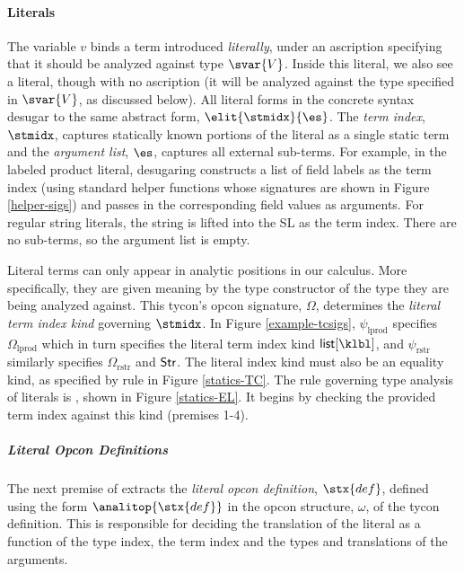 \paragraph{Literals} The variable $v$ binds a term introduced \emph{literally}, under an ascription specifying that it should be analyzed against type $\svar{V}$. Inside this literal, we also see a literal, though with no ascription (it will be analyzed against the type specified in $\svar{V}$, as discussed below). All literal forms in the concrete syntax desugar to the same abstract form, $\elit{\stmidx}{\es}$. The \emph{term index},  $\stmidx$, captures statically known portions of the literal as a single static term and the \emph{argument list}, $\es$,  captures all external sub-terms. For example, in the labeled product literal, desugaring constructs a list of field labels as the term index (using standard helper functions whose signatures are shown in Figure \ref{helper-sigs}) and passes in the  corresponding field values as arguments. For regular string literals, the string is lifted into the SL as the term index. There are no sub-terms, so the argument list is empty.

Literal terms can only appear in analytic positions in our calculus. More specifically, they are given meaning by {the type constructor of the type they are being analyzed against}. 
This tycon's opcon signature, $\Omega$,  determines the \emph{literal term index kind} governing $\stmidx$. In Figure \ref{example-tcsigs}, $\psi_\text{lprod}$ specifies $\Omega_\text{lprod}$ which in turn specifies the literal term index kind $\klist{\klbl}$, and $\psi_\text{rstr}$ similarly specifies $\Omega_\text{rstr}$ and ${\textsf{Str}}$. The literal index kind must also be an equality kind, as specified by rule  in Figure \ref{statics-TC}. The rule governing type analysis of literals is , shown in Figure \ref{statics-EL}. It begins by checking the provided term index against this kind (premises 1-4).%

\subparagraph{Literal Opcon Definitions} 


The next premise of  extracts the \emph{literal opcon definition}, $\stx{def}$, defined using the form $\analitop{\stx{def}}$ in the opcon structure, $\omega$, of the tycon definition. This  is responsible for deciding the translation of the literal as a function of the type index, the term index and  the types and translations of the arguments. %

